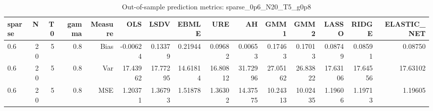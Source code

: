 \begin{table}[!htbp]\centering
\caption{Out-of-sample prediction metrics: sparse_0p6_N20_T5_g0p8}
\label{tab:table3_sparse_0p6_N20_T5_g0p8}
\begin{tabular}{lrrrrrrrrrrrrrr}
\hline
sparse & N & T0 & gamma & Measure & OLS & LSDV & EBMLE & URE & AH & GMM1 & GMM2 & LASSO & RIDGE & ELASTIC_NET \\
\hline
0.6 & 20 & 5 & 0.8 & Bias & -0.00624 & 0.13379 & 0.21944 & 0.09682 & 0.00653 & 0.17463 & 0.17013 & 0.08749 & 0.08591 & 0.08750 \\
0.6 & 20 & 5 & 0.8 & Var & 17.43962 & 17.77295 & 14.61814 & 16.80812 & 31.72996 & 27.05162 & 26.83822 & 17.63106 & 17.64556 & 17.63102 \\
0.6 & 20 & 5 & 0.8 & MSE & 1.20371 & 1.36793 & 1.51878 & 1.36302 & 14.37575 & 10.24313 & 10.02435 & 1.19606 & 1.19713 & 1.19605 \\
\hline
\end{tabular}
\end{table}

